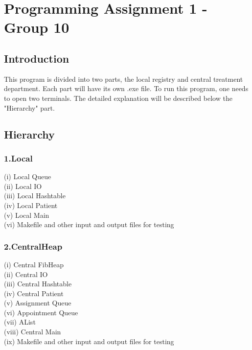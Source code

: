\documentclass{article}
\begin{document}
\section*{Programming Assignment 1 - Group 10}
\subsection*{Introduction}
    This program is divided into two parts, the local registry and central treatment department. Each part will have its
    own .exe file. To run this program, one needs to open two terminals. The detailed explanation will be described below 
    the "Hierarchy" part.
\subsection*{Hierarchy}
\subsubsection*{1.Local}
\indent(i) Local Queue\\
\indent(ii) Local IO\\
\indent(iii) Local Hashtable\\
\indent(iv) Local Patient\\
\indent(v) Local Main\\
\indent(vi) Makefile and other input and output files for testing
\subsubsection*{2.CentralHeap}
\indent(i) Central FibHeap\\
\indent(ii) Central IO\\
\indent(iii) Central Hashtable\\
\indent(iv) Central Patient\\
\indent(v) Assignment Queue\\
\indent(vi) Appointment Queue\\
\indent(vii) AList\\
\indent(viii) Central Main\\
\indent(ix) Makefile and other input and output files for testing
\end{document}
